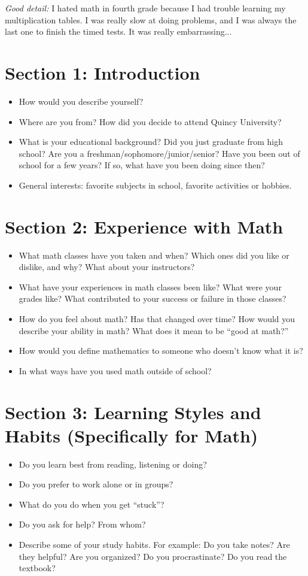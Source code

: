 \documentclass{article}
\begin{document}
\noindent\textit{Good detail:} I hated math in fourth grade because I had trouble learning my multiplication tables.  I was really slow at doing problems, and I was always the last one to finish the timed tests.  It was really embarrassing...

\section*{Section 1: Introduction}
\begin{itemize}
\item How would you describe yourself?
\item Where are you from? How did you decide to attend Quincy University?
\item What is your educational background? Did you just graduate from high school? Are you a freshman/sophomore/junior/senior? Have you been out of school for a few years? If so, what have you been doing since then?
\item General interests: favorite subjects in school, favorite activities or hobbies.
\end{itemize}

\section*{Section 2: Experience with Math}
\begin{itemize}
\item What math classes have you taken and when? Which ones did you like or dislike, and why? What about your instructors?
\item What have your experiences in math classes been like? What were your grades like? What contributed to your success or failure in those classes?
\item How do you feel about math? Has that changed over time? How would you describe your ability in math? What does it mean to be ``good at math?''
\item How would you define mathematics to someone who doesn't know what it is?
\item In what ways have you used math outside of school?
\end{itemize}

\section*{Section 3: Learning Styles and Habits (Specifically for Math)}
\begin{itemize}
\item Do you learn best from reading, listening or doing?
\item Do you prefer to work alone or in groups?
\item What do you do when you get ``stuck''?
\item Do you ask for help?  From whom?
\item Describe some of your study habits. For example: Do you take notes? Are they helpful? Are you organized? Do you procrastinate? Do you read the textbook?
\end{itemize}
\end{document}
